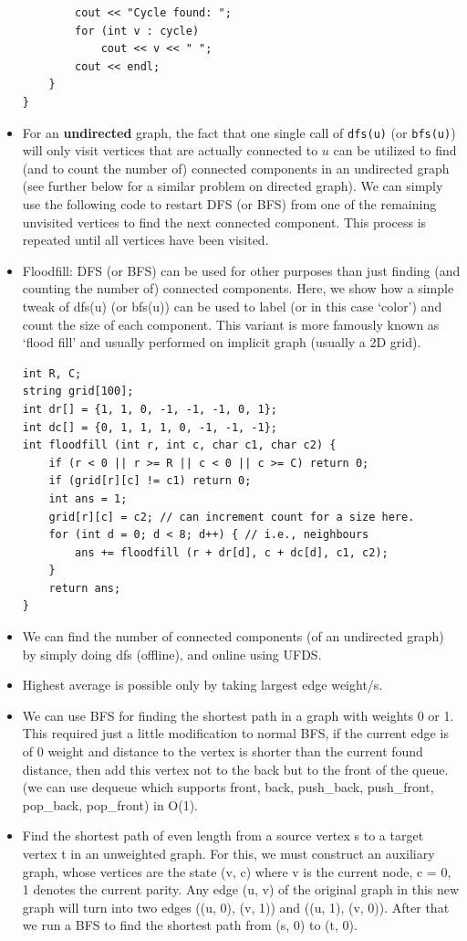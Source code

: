 \documentclass[8pt, a4paper, oneside, twocolumn]{extarticle}
\begin{document}
\begin{itemize}
\begin{verbatim}
        cout << "Cycle found: ";
        for (int v : cycle)
            cout << v << " ";
        cout << endl;
    }
}
    \end{verbatim}
    \item For an \textbf{undirected} graph, the fact that one single call of \texttt{dfs(u)} (or \texttt{bfs(u)}) will only visit vertices that are actually connected to $u$ can be utilized to find (and to count the number of) connected components in an undirected graph (see further below for a similar problem on directed graph). We can simply use the following code to restart DFS (or BFS) from one of the remaining unvisited vertices to find the next connected component. This process is repeated until all vertices have been visited.
    \item Floodfill: DFS (or BFS) can be used for other purposes than just finding (and counting the number of) connected components. Here, we show how a simple tweak of dfs(u) (or bfs(u)) can be used to label (or in this case ‘color’) and count the size of each component. This variant is more famously
    known as ‘flood fill’ and usually performed on implicit graph (usually a 2D grid).
    \begin{verbatim}
int R, C;
string grid[100];
int dr[] = {1, 1, 0, -1, -1, -1, 0, 1};
int dc[] = {0, 1, 1, 1, 0, -1, -1, -1};
int floodfill (int r, int c, char c1, char c2) {
    if (r < 0 || r >= R || c < 0 || c >= C) return 0;
    if (grid[r][c] != c1) return 0;
    int ans = 1;
    grid[r][c] = c2; // can increment count for a size here.
    for (int d = 0; d < 8; d++) { // i.e., neighbours
        ans += floodfill (r + dr[d], c + dc[d], c1, c2);
    }
    return ans;
}
    \end{verbatim}
    \item We can find the number of connected components (of an undirected graph) by simply doing dfs (offline), and online using UFDS.
    \item Highest average is possible only by taking largest edge weight/s. 
    \item We can use BFS for finding the shortest path in a graph with weights 0 or 1. This required just a little modification to normal BFS, if the current edge is of 0 weight and distance to the vertex is shorter than the current found distance, then add this vertex not to the back but to the front of the queue. (we can use dequeue which supports front, back, push\_{}back, push\_{}front, pop\_{}back, pop\_{}front) in O(1).
    \item Find the shortest path of even length from a source vertex s to a target vertex t in an unweighted graph. For this, we must construct an auxiliary graph, whose vertices are the state (v, c) where v is the current node, c = 0, 1 denotes the current parity. Any edge (u, v) of the original graph in this new graph will turn into two edges ((u, 0), (v, 1)) and ((u, 1), (v, 0)). After that we run a BFS to find the shortest path from (s, 0) to (t, 0).

\end{itemize}
\end{document}
